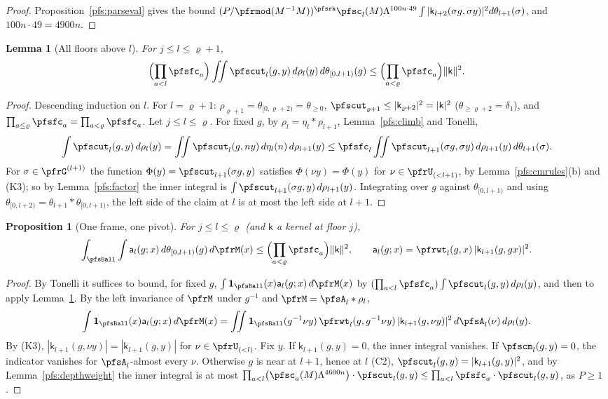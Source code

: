 \documentclass[10pt]{amsart}
\newtheorem{proposition}[theorem]{Proposition}
\newtheorem{lemma}[theorem]{Lemma}
\theoremstyle{definition}
\theoremstyle{remark}
\begin{document}
\begin{proof}
Proposition~\ref{pfs:parseval} gives the bound $(P/\pfrmod(M^{-1}M))^{\pfsrk}\pfsc_l(M)\Lambda^{100n\cdot49}\int|\mathsf k_{l+2}
(\sigma g,\sigma y)|^2d\theta_{l+1}(\sigma)$, and $100n\cdot49=4900n$.
\end{proof}

\begin{lemma}[All floors above $l$]\label{pfs:allfloors}
For $j\le l\le\varrho+1$,
\[
\Bigl(\prod_{a<l}\pfsfc_a\Bigr)\iint\pfscut_l(g,y)\,d\rho_l(y)\,d\theta_{[0,l+1)}(g)\le\Bigl(\prod_{a<\varrho}\pfsfc_a\Bigr)\|\mathsf k\|^2 .
\]
\end{lemma}
\begin{proof}
Descending induction on $l$. For $l=\varrho+1$: $\rho_{\varrho+1}=\theta_{[0,\varrho+2)}=\theta_{\ge0}$, $\pfscut_{\varrho+1}\le|\mathsf k_{\varrho+2}|^2=|\mathsf k|^2$
($\theta_{\ge\varrho+2}=\delta_1$), and $\prod_{a\le\varrho}\pfsfc_a=\prod_{a<\varrho}\pfsfc_a$. Let $j\le l\le\varrho$. For fixed $g$, by
$\rho_l=\eta_l*\rho_{l+1}$, Lemma~\ref{pfs:climb} and Tonelli,
\[
\int\pfscut_l(g,y)\,d\rho_l(y)=\iint\pfscut_l(g,ny)\,d\eta_l(n)\,d\rho_{l+1}(y)\le\pfsfc_l\iint\pfscut_{l+1}(\sigma g,\sigma y)\,
d\rho_{l+1}(y)\,d\theta_{l+1}(\sigma).
\]
For $\sigma\in\pfrG^{(l+1)}$ the function $\Phi(y)=\pfscut_{l+1}(\sigma g,y)$ satisfies $\Phi(\nu y)=\Phi(y)$ for $\nu\in\pfrU_{(<l+1)}$,
by Lemma~\ref{pfs:cmrules}(b) and (K3); so by Lemma~\ref{pfs:factor} the inner integral is $\int\pfscut_{l+1}(\sigma g,y)\,d\rho_{l+1}(y)$.
Integrating over $g$ against $\theta_{[0,l+1)}$ and using $\theta_{[0,l+2)}=\theta_{l+1}*\theta_{[0,l+1)}$, the left side of the
claim at $l$ is at most the left side at $l+1$.
\end{proof}

\begin{proposition}[One frame, one pivot]\label{pfs:pivot}
For $j\le l\le\varrho$ (and $\mathsf k$ a kernel at floor $j$),
\[
\int_{\pfsBall}\int\mathsf a_l(g;x)\,d\theta_{[0,l+1)}(g)\,d\pfrM(x)\le\Bigl(\prod_{a<\varrho}\pfsfc_a\Bigr)\|\mathsf k\|^2,
\qquad\mathsf a_l(g;x)=\pfrwt_l(g,x)\,|\mathsf k_{l+1}(g,gx)|^2 .
\]
\end{proposition}
\begin{proof}
By Tonelli it suffices to bound, for fixed $g$, $\int\mathbf 1_\pfsBall(x)\mathsf a_l(g;x)\,d\pfrM(x)$ by
$(\prod_{a<l}\pfsfc_a)\int\pfscut_l(g,y)\,d\rho_l(y)$, and then to apply Lemma~\ref{pfs:allfloors}. By the left invariance of
$\pfrM$ under $g^{-1}$ and $\pfrM=\pfsA_l*\rho_l$,
\[
\int\mathbf 1_\pfsBall(x)\mathsf a_l(g;x)\,d\pfrM(x)=\iint\mathbf 1_\pfsBall(g^{-1}\nu y)\,\pfrwt_l(g,g^{-1}\nu y)\,|\mathsf k_{l+1}(g,\nu y)|^2
\,d\pfsA_l(\nu)\,d\rho_l(y).
\]
By (K3), $|\mathsf k_{l+1}(g,\nu y)|=|\mathsf k_{l+1}(g,y)|$ for $\nu\in\pfrU_{(<l)}$. Fix $y$. If $\mathsf k_{l+1}(g,y)=0$, the inner
integral vanishes. If $\pfscm_l(g,y)=0$, the indicator vanishes for $\pfsA_l$-almost every $\nu$. Otherwise $g$ is near at $l+1$,
hence at $l$ (C2), $\pfscut_l(g,y)=|\mathsf k_{l+1}(g,y)|^2$, and by Lemma~\ref{pfs:depthweight} the inner integral is at most
$\prod_{a<l}\bigl(\pfsc_a(M)\Lambda^{4600n}\bigr)\cdot\pfscut_l(g,y)\le\prod_{a<l}\pfsfc_a\cdot\pfscut_l(g,y)$, as $P\ge1$.
\end{proof}
\end{document}

